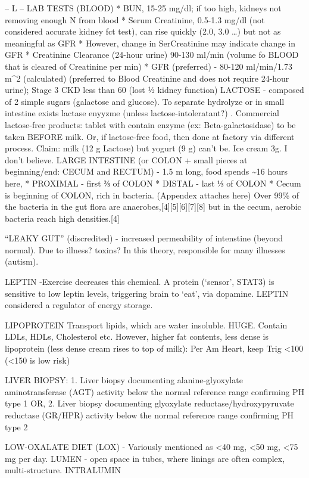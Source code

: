-- L -- LAB TESTS (BLOOD) * BUN, 15-25 mg/dl; if too high, kidneys not
removing enough N from blood * Serum Creatinine, 0.5-1.3 mg/dl (not
considered accurate kidney fct test), can rise quickly (2.0, 3.0 \ldots)
but not as meaningful as GFR * However, change in SerCreatinine may
indicate change in GFR * Creatinine Clearance (24-hour urine) 90-130
ml/min (volume fo BLOOD that is cleared of Creatinine per min) * GFR
(preferred) - 80-120 ml/min/1.73 m\^{}2 (calculated) (preferred to Blood
Creatinine and does not require 24-hour urine); Stage 3 CKD less than 60
(lost ½ kidney function) LACTOSE - composed of 2 simple sugars
(galactose and glucose). To separate hydrolyze or in small intestine
exists lactase enyyzme (unless lactose-intoleratant?) . Commercial
lactose-free products: tablet with contain enzyme (ex:
Beta-galactosidase) to be taken BEFORE milk. Or, if lactose-free food,
then done at factory via different process. Claim: milk (12 g Lactose)
but yogurt (9 g) can't be. Ice cream 3g. I don't believe. LARGE
INTESTINE (or COLON + small pieces at beginning/end: CECUM and RECTUM) -
1.5 m long, food spends \textasciitilde16 hours here, * PROXIMAL - first
⅔ of COLON * DISTAL - last ⅓ of COLON * Cecum is beginning of COLON,
rich in bacteria. (Appendex attaches here) Over 99\% of the bacteria in
the gut flora are anaerobes,{[}4{]}{[}5{]}{[}6{]}{[}7{]}{[}8{]} but in
the cecum, aerobic bacteria reach high densities.{[}4{]}

``LEAKY GUT'' (discredited) - increased permeability of intenstine
(beyond normal). Due to illness? toxins? In this theory, responsible for
many illnesses (autism).

LEPTIN -Exercise decreases this chemical. A protein (`sensor', STAT3) is
sensitive to low leptin levels, triggering brain to `eat', via dopamine.
LEPTIN considered a regulator of energy storage.

LIPOPROTEIN Transport lipids, which are water insoluble. HUGE. Contain
LDLs, HDLs, Cholesterol etc. However, higher fat contents, less dense is
lipoprotein (less dense cream rises to top of milk): Per Am Heart, keep
Trig \textless100 (\textless150 is low risk)

LIVER BIOPSY: 1. Liver biopsy documenting alanine-glyoxylate
aminotransferase (AGT) activity below the normal reference range
confirming PH type 1 OR, 2. Liver biopsy documenting glyoxylate
reductase/hydroxypyruvate reductase (GR/HPR) activity below the normal
reference range confirming PH type 2

LOW-OXALATE DIET (LOX) - Variously mentioned as \textless40 mg,
\textless50 mg, \textless75 mg per day. LUMEN - open space in tubes,
where linings are often complex, multi-structure. INTRALUMIN

